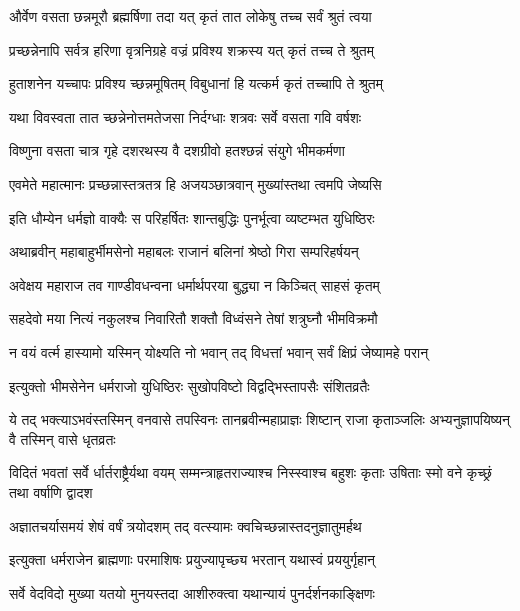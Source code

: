 \twolineshloka
{और्वेण वसता छन्नमूरौ ब्रह्मर्षिणा तदा}
{यत् कृतं तात लोकेषु तच्च सर्वं श्रुतं त्वया}


\twolineshloka
{प्रच्छन्नेनापि सर्वत्र हरिणा वृत्रनिग्रहे}
{वज्रं प्रविश्य शक्रस्य यत् कृतं तच्च ते श्रुतम्}


\twolineshloka
{हुताशनेन यच्चापः प्रविश्य च्छन्नमूषितम्}
{विबुधानां हि यत्कर्म कृतं तच्चापि ते श्रुतम्}


\twolineshloka
{यथा विवस्वता तात च्छन्नेनोत्तमतेजसा}
{निर्दग्धाः शत्रवः सर्वे वसता गवि वर्षशः}


\twolineshloka
{विष्णुना वसता चात्र गृहे दशरथस्य वै}
{दशग्रीवो हतश्छन्नं संयुगे भीमकर्मणा}


\twolineshloka
{एवमेते महात्मानः प्रच्छन्नास्तत्रतत्र हि}
{अजयञ्छात्रवान् मुख्यांस्तथा त्वमपि जेष्यसि}



\twolineshloka
{इति धौम्येन धर्मज्ञो वाक्यैः स परिहर्षितः}
{शान्तबुद्धिः पुनर्भूत्वा व्यष्टम्भत युधिष्ठिरः}


\twolineshloka
{अथाब्रवीन् महाबाहुर्भीमसेनो महाबलः}
{राजानं बलिनां श्रेष्ठो गिरा सम्परिहर्षयन्}


\twolineshloka
{अवेक्षय महाराज तव गाण्डीवधन्वना}
{धर्मार्थपरया बुद्ध्या न किञ्चित् साहसं कृतम्}


\twolineshloka
{सहदेवो मया नित्यं नकुलश्च निवारितौ}
{शक्तौ विध्वंसने तेषां शत्रुघ्नौ भीमविक्रमौ}


\twolineshloka
{न वयं वर्त्म हास्यामो यस्मिन् योक्ष्यति नो भवान्}
{तद् विधत्तां भवान् सर्वं क्षिप्रं जेष्यामहे परान्}


\twolineshloka
{इत्युक्तो भीमसेनेन धर्मराजो युधिष्ठिरः}
{सुखोपविष्टो विद्वद्भिस्तापसैः संशितव्रतैः}


\threelineshloka
{ये तद् भक्त्याऽभवंस्तस्मिन् वनवासे तपस्विनः}
{तानब्रवीन्महाप्राज्ञः शिष्टान् राजा कृताञ्जलिः}
{अभ्यनुज्ञापयिष्यन् वै तस्मिन् वासे धृतव्रतः}


\threelineshloka
{विदितं भवतां सर्वे र्धार्तराष्ट्रैर्यथा वयम्}
{सम्मन्त्राहृतराज्याश्च निस्स्वाश्च बहुशः कृताः}
{उषिताः स्मो वने कृच्छ्रं तथा वर्षाणि द्वादश}


\twolineshloka
{अज्ञातचर्यासमयं शेषं वर्षं त्रयोदशम्}
{तद् वत्स्यामः क्वचिच्छन्नास्तदनुज्ञातुमर्हथ}


\twolineshloka
{इत्युक्ता धर्मराजेन ब्राह्मणाः परमाशिषः}
{प्रयुज्यापृच्छ्य भरतान् यथास्वं प्रययुर्गृहान्}


\twolineshloka
{सर्वे वेदविदो मुख्या यतयो मुनयस्तदा}
{आशीरुक्त्वा यथान्यायं पुनर्दर्शनकाङ्क्षिणः}


